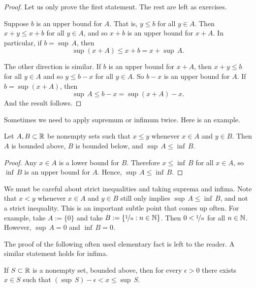 \begin{proof}
Let us only prove the first statement.  The rest are left as exercises.

Suppose $b$ is an upper bound for $A$.  That is, $y \leq b$ for all $y \in A$.
Then $x+y \leq x+b$ for all $y \in A$, and so $x+b$ is an upper
bound for $x+A$.  In particular, if $b = \sup\, A$, then
\begin{equation*}
\sup (x+A) \leq x+b = x+ \sup\, A .
\end{equation*}

The other direction is similar.  If $b$ is an upper bound for $x+A$,
then $x+y \leq b$
for all $y \in A$ and so $y \leq b-x$ for all $y \in A$.
So $b-x$ is an upper bound for $A$.  If $b =
\sup (x+A)$, then 
\begin{equation*}
\sup\, A \leq b-x = \sup (x+A) -x .
\end{equation*}
And the result follows.
\end{proof}

Sometimes we need to apply supremum or infimum twice.  Here is an example.

\begin{prop} \label{infsupineq:prop}
Let $A, B \subset {\mathbb{R}}$ be nonempty sets such that $x \leq y$ whenever $x \in A$ and
$y \in B$.  Then $A$ is bounded above, $B$ is bounded below, and $\sup\, A \leq \inf\, B$.
\end{prop}

\begin{proof}
Any $x \in A$ is a lower bound for $B$.  Therefore
$x \leq \inf\, B$ for all $x \in A$, so $\inf\, B$ is an upper bound for
$A$.
Hence,
$\sup\, A \leq \inf\, B$.
\end{proof}

We must be careful about strict inequalities and taking suprema and
infima.  Note that
$x < y$ whenever $x \in A$ and
$y \in B$ still only implies $\sup\, A \leq \inf\, B$, and not a strict
inequality.  This is an important subtle point that comes up often.
For example, take $A := \{ 0 \}$ and take $B := \{ \nicefrac{1}{n}
: n \in {\mathbb{N}} \}$.
Then $0 < \nicefrac{1}{n}$
for all $n \in {\mathbb{N}}$.  However, $\sup\, A = 0$ and $\inf\, B = 0$.


The proof of the following
often used elementary fact is left to the reader.
A similar statement holds for infima.

\begin{prop} \label{prop:existsxepsfromsup}
If $S \subset {\mathbb{R}}$ is a nonempty set, bounded above,
then for every $\epsilon > 0$ there exists $x \in S$ such
that $(\sup\, S) - \epsilon < x \leq \sup\, S$.
\end{prop}



